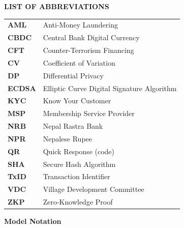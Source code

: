 \documentclass[12pt,a4paper,oneside,openany]{report}
\begin{document}
\addtocounter{page}{-1}
\pagestyle{plain}






\clearpage
\tableofcontents
\clearpage
\listoffigures
{}
{}
\clearpage
\listoftables
{}
{}
\clearpage
\begin{center}
{\Large \textbf{LIST OF ABBREVIATIONS}}\\[1cm]
\end{center}
{}

\begin{tabular}{ll}
\textbf{AML}      & Anti-Money Laundering\\
\textbf{CBDC}     & Central Bank Digital Currency\\
\textbf{CFT}      & Counter-Terrorism Financing\\
\textbf{CV}       & Coefficient of Variation\\
\textbf{DP}       & Differential Privacy\\
\textbf{ECDSA}    & Elliptic Curve Digital Signature Algorithm\\
\textbf{KYC}      & Know Your Customer\\
\textbf{MSP}      & Membership Service Provider\\
\textbf{NRB}      & Nepal Rastra Bank\\
\textbf{NPR}      & Nepalese Rupee\\
\textbf{QR}       & Quick Response (code)\\
\textbf{SHA}      & Secure Hash Algorithm\\
\textbf{TxID}     & Transaction Identifier\\
\textbf{VDC}      & Village Development Committee\\
\textbf{ZKP}      & Zero-Knowledge Proof\\
\end{tabular}

\vspace{1.2em}
\noindent\textbf{Model Notation}
\end{document}
